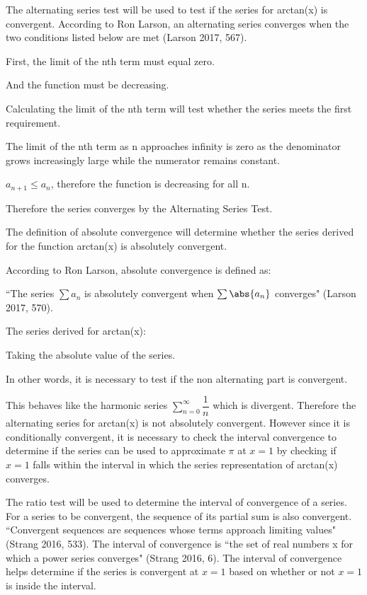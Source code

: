The alternating series test will be used to test if the series for arctan(x) is convergent. According to Ron Larson, an alternating series converges when the two conditions listed below are met (Larson 2017, 567).

First, the limit of the nth term must equal zero.

And the function must be decreasing.

Calculating the limit of the nth term will test whether the series meets the first requirement.

The limit of the nth term as n approaches infinity is zero as the denominator grows increasingly large while the numerator remains constant.

\(a_{n+1} \leq a_{n}\), therefore the function is decreasing for all n. 

Therefore the series converges by the Alternating Series Test.

The definition of absolute convergence will determine whether the series derived for the function arctan(x) is absolutely convergent.

According to Ron Larson, absolute convergence is defined as: 

``The series \(\sum a_{n}\) is absolutely convergent when \(\sum \abs{a_{n}}\) converges" (Larson 2017, 570).

The series derived for arctan(x):

Taking the absolute value of the series.

In other words, it is necessary to test if the non alternating part is convergent.

This behaves like the harmonic series \(\sum\limits_{n=0}^{\infty} \dfrac{1}{n}\) which is divergent. Therefore the alternating series for arctan(x) is not absolutely convergent. However since it is conditionally convergent, it is necessary to check the interval convergence to determine if the series can be used to approximate \(\pi\) at \(x = 1\) by checking if \(x = 1\) falls within the interval in which the series representation of arctan(x) converges.

The ratio test will be used to determine the interval of convergence of a series. For a series to be convergent, the sequence of its partial sum is also convergent. ``Convergent sequences are sequences whose terms approach limiting values" (Strang 2016, 533). The interval of convergence is ``the set of real numbers x for which a power series converges" (Strang 2016, 6). The interval of convergence helps determine if the series is convergent at \(x = 1\) based on whether or not \(x = 1\) is inside the interval.

